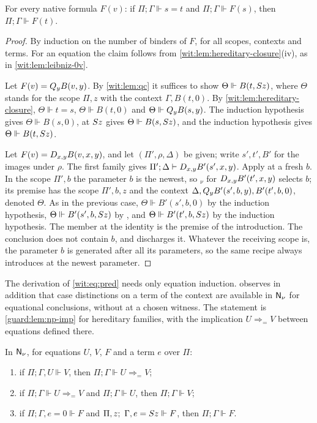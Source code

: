 \begin{lemma}
\label{wit:lem:hl}
For every native formula $F(v)$: if $\Pi;\Gamma\Vdash s=t$ and
$\Pi;\Gamma\Vdash F(s)$, then $\Pi;\Gamma\Vdash F(t)$.
\end{lemma}

\begin{proof}
By induction on the number of binders of $F$, for all scopes, contexts and
terms.  For an equation the claim follows from
\cref{wit:lem:hereditary-closure}(iv), as in \cref{wit:lem:leibniz-0v}.

Let $F(v)=Q_{y}B(v,y)$.  By \cref{wit:lem:qc} it suffices to show
$\Theta\Vdash B(t,S z)$, where $\Theta$ stands for the scope $\Pi,z$ with
the context $\Gamma,B(t,0)$.  By \cref{wit:lem:hereditary-closure},
$\Theta\Vdash t=s$, $\Theta\Vdash B(t,0)$ and $\Theta\Vdash Q_{y}B(s,y)$.
The induction hypothesis gives $\Theta\Vdash B(s,0)$,  at
$S z$ gives $\Theta\Vdash B(s,S z)$, and the induction hypothesis
gives $\Theta\Vdash B(t,S z)$.

Let $F(v)=D_{x,y}B(v,x,y)$, and let $(\Pi',\rho,\Delta)$ be given; write
$s',t',B'$ for the images under $\rho$.  The first family gives
$\Pi';\Delta\vdash D_{x,y}B'(s',x,y)$.  Apply  at a fresh $b$.
In the scope $\Pi',b$ the parameter $b$ is the newest, so
$_\nu$ for $D_{x,y}B'(t',x,y)$ selects $b$; its premise has
the scope $\Pi',b,z$ and the context
$\Delta,Q_{y}B'(s',b,y),B'(t',b,0)$, denoted $\Theta$.  As in the previous
case, $\Theta\Vdash B'(s',b,0)$ by the induction hypothesis,
$\Theta\Vdash B'(s',b,S z)$ by , and
$\Theta\Vdash B'(t',b,S z)$ by the induction hypothesis.  The member at
the identity is the premise of the introduction.  The conclusion does not
contain $b$, and  discharges it.  Whatever the receiving scope
is, the parameter $b$ is generated after all its parameters, so the same
recipe always introduces at the newest parameter.
\end{proof}

The derivation of \eqref{wit:eq:pred} needs only equation induction.
 observes in addition that case distinctions on a
term of the context are available in $\mathsf{N}_{\nu}$ for equational
conclusions, without  at a chosen witness.  The statement is
\cref{guard:lem:np-imp} for hereditary families, with the implication
$U\Rightarrow_{=}V$ between equations defined there.

\begin{lemma}
\label{wit:lem:eqcases}
In $\mathsf{N}_{\nu}$, for equations $U$, $V$, $F$ and a term $e$ over $\Pi$:
\begin{enumerate}[label=\textup{(\roman*)}]
\item if $\Pi;\Gamma,U\Vdash V$, then
 $\Pi;\Gamma\Vdash U\Rightarrow_{=}V$;
\item if $\Pi;\Gamma\Vdash U\Rightarrow_{=}V$ and
 $\Pi;\Gamma\Vdash U$, then $\Pi;\Gamma\Vdash V$;
\item if $\Pi;\Gamma,e=0\Vdash F$ and
 $\Pi,z;\ \Gamma,e=S z\Vdash F$, then $\Pi;\Gamma\Vdash F$.
\end{enumerate}
\end{lemma}

